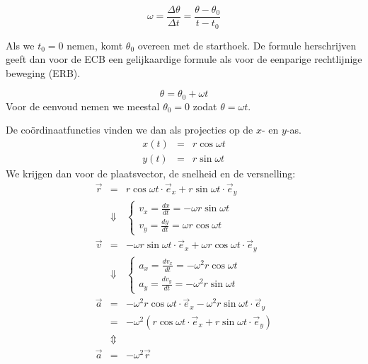 \documentclass{ximera}
\begin{document}
\begin{equation*}
	\omega=\frac{\Delta\theta}{\Delta t}=\frac{\theta-\theta_0}{t-t_0} %
\end{equation*}

Als we \(t_0 = 0\) nemen, komt \(\theta_0\) overeen met de starthoek. 
De formule herschrijven geeft dan voor de ECB een gelijkaardige formule als voor de eenparige rechtlijnige beweging (ERB).

\begin{equation*}
	\theta=\theta_0+\omega t
\end{equation*}
Voor de eenvoud nemen we meestal $\theta_0=0$ zodat $\theta=\omega t$. 



De coördinaatfuncties vinden we dan als projecties op de $x$- en $y$-as. 
\begin{eqnarray*}
	x(t)&=&r\cos\omega t\\
	y(t)&=&r\sin\omega t
\end{eqnarray*}
We krijgen dan voor de plaatsvector, de snelheid en de versnelling:
\begin{eqnarray}
	\vec{r}&=&r\cos\omega t\cdot\vec{e}_x+r\sin\omega t\cdot\vec{e}_y\nonumber\\
	&\Downarrow&
	\left\{
		\begin{array}{l}
			v_x=\frac{dx}{dt}=-\omega r\sin\omega t\\
			v_y=\frac{dy}{dt}=\omega r\cos\omega t
		\end{array}
	\right.\nonumber\\
	\vec{v}&=&-\omega r\sin\omega t\cdot\vec{e}_x+\omega r\cos\omega t\cdot\vec{e}_y\nonumber\\
	&\Downarrow&
	\left\{
		\begin{array}{l}
			a_x=\frac{dv_x}{dt}=-\omega^2 r\cos\omega t\\
			a_y=\frac{dv_y}{dt}=-\omega^2 r\sin\omega t
		\end{array}
	\right.\nonumber\\
	\vec{a}&=&-\omega^2 r\cos\omega t\cdot\vec{e}_x-\omega^2 r\sin\omega t\cdot\vec{e}_y\nonumber\\
	&=&-\omega^2(r\cos\omega t\cdot\vec{e}_x+r\sin\omega t\cdot\vec{e}_y)\nonumber\\
	&\Updownarrow&\nonumber\\
	\vec{a}&=&-\omega^2\vec{r}\label{versnelling}
\end{eqnarray}
\end{document}
